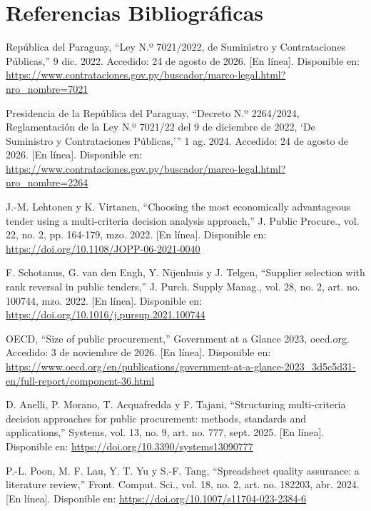 \documentclass[12pt,a4paper]{article}
\newenvironment{reflist}{%
  \small\sloppy
  \begin{list}{}{%
    \setlength{\leftmargin}{1cm}%
    \setlength{\itemindent}{-1cm}%
    \setlength{\itemsep}{8pt}%
    \setlength{\parsep}{0pt}%
    \setlength{\listparindent}{0pt}%
  }%
}{\end{list}}
\begin{document}
\section*{Referencias Bibliográficas}
\begin{reflist}

\item[] [1] República del Paraguay, ``Ley N.º 7021/2022, de Suministro y Contrataciones Públicas,'' 9 dic. 2022. Accedido: 24 de agosto de 2026. [En línea]. Disponible en: \url{https://www.contrataciones.gov.py/buscador/marco-legal.html?nro_nombre=7021}

\item[] [2] Presidencia de la República del Paraguay, ``Decreto N.º 2264/2024, Reglamentación de la Ley N.º 7021/22 del 9 de diciembre de 2022, `De Suministro y Contrataciones Públicas,''' 1 ag. 2024. Accedido: 24 de agosto de 2026. [En línea]. Disponible en: \url{https://www.contrataciones.gov.py/buscador/marco-legal.html?nro_nombre=2264}

\item[] [3] J.-M. Lehtonen y K. Virtanen, ``Choosing the most economically advantageous tender using a multi-criteria decision analysis approach,'' J. Public Procure., vol. 22, no. 2, pp. 164-179, mzo. 2022. [En línea]. Disponible en: \url{https://doi.org/10.1108/JOPP-06-2021-0040}

\item[] [4] F. Schotanus, G. van den Engh, Y. Nijenhuis y J. Telgen, ``Supplier selection with rank reversal in public tenders,'' J. Purch. Supply Manag., vol. 28, no. 2, art. no. 100744, mzo. 2022. [En línea]. Disponible en: \url{https://doi.org/10.1016/j.pursup.2021.100744}

\item[] [5] OECD, ``Size of public procurement,'' Government at a Glance 2023, oecd.org. Accedido: 3 de noviembre de 2026. [En línea]. Disponible en: \url{https://www.oecd.org/en/publications/government-at-a-glance-2023_3d5c5d31-en/full-report/component-36.html}

\item[] [6] D. Anelli, P. Morano, T. Acquafredda y F. Tajani, ``Structuring multi-criteria decision approaches for public procurement: methods, standards and applications,'' Systems, vol. 13, no. 9, art. no. 777, sept. 2025. [En línea]. Disponible en: \url{https://doi.org/10.3390/systems13090777}

\item[] [7] P.-L. Poon, M. F. Lau, Y. T. Yu y S.-F. Tang, ``Spreadsheet quality assurance: a literature review,'' Front. Comput. Sci., vol. 18, no. 2, art. no. 182203, abr. 2024. [En línea]. Disponible en: \url{https://doi.org/10.1007/s11704-023-2384-6}


\end{reflist}
\end{document}
